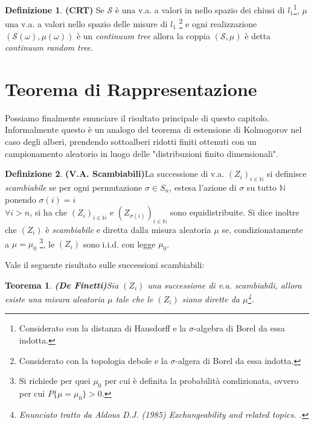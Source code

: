\documentclass[11pt, twoside]{report}
\newcommand{\Ss}{\mathscr{S}}
\theoremstyle{definition}
\newtheorem{definizione}{Definizione}[chapter]
\theoremstyle{plain}
\newtheorem{teo}{Teorema}[chapter]
\theoremstyle{remark}
\numberwithin{equation}{chapter}
\begin{document}
\begin{definizione}{\textbf{(CRT)}}
Se $\Ss$ è una v.a. a valori in nello spazio dei chiusi di $l_1$\footnote{Considerato con la distanza di Hausdorff e la $\sigma$-algebra di Borel da essa indotta.}, $\mu$ una v.a. a valori nello spazio delle misure di $l_1$ \footnote{Considerato con la topologia debole e la $\sigma$-algera di Borel da essa indotta.} e ogni realizzazione $(\Ss(\omega), \mu(\omega))$ è un \textit{continuum tree} allora la coppia $(\Ss, \mu)$ è detta \textit{continuum random tree}.
\end{definizione}

\section{Teorema di Rappresentazione}
Possiamo finalmente enunciare il risultato principale di questo capitolo. Informalmente questo è un analogo del teorema di estensione di Kolmogorov nel caso degli alberi, prendendo sottoalberi ridotti finiti ottenuti con un campionamento aleatorio in luogo delle "distribuzioni finito dimensionali".
\begin{definizione}{\textbf{(V.A. Scambiabili)}}\label{def_scamb}
La successione di v.a. $(Z_i)_{i \in \mathbb{N}}$ si definisce \textit{scambiabile} se per ogni permutazione $\sigma \in S_n$, estesa l'azione di $\sigma$ su tutto $\mathbb{N}$ ponendo ${\sigma(i)=i}$\\$\forall i>n$, si ha che $(Z_i)_{i \in \mathbb{N}}$ e $(Z_{\sigma(i)})_{i \in \mathbb{N}}$ sono equidistribuite.
Si dice inoltre che $(Z_i)$ è \textit{scambiabile} e diretta dalla misura aleatoria $\mu$ se, condizionatamente a $\mu=\mu_0$ \footnote{Si richiede per quei $\mu_0$ per cui è definita la probabilità condizionata, ovvero per cui $P\{\mu=\mu_0\}>0$.}, le $(Z_i)$ sono i.i.d. con legge $\mu_0$.
\end{definizione}
Vale il seguente risultato sulle successioni scambiabili:
\begin{teo}{\textbf{(De Finetti)}}\label{de_finetti}
Sia $(Z_i)$ una successione di v.a. scambiabili, allora esiste una misura aleatoria $\mu$ tale che le $(Z_i)$ siano dirette da $\mu$\footnote{Enunciato tratto da Aldous D.J. (1985) \textit{Exchangeability and related topics.} \cite{Ald_definetti}.}.
\end{teo}
\end{document}
